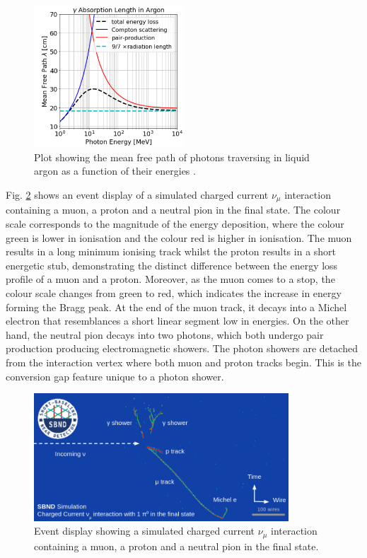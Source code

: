 \begin{figure}[ht!] 
\centering    
\includegraphics[width=0.5\textwidth]{uboone_gamma}
\caption[uboone_gamma]{
Plot showing the mean free path of photons traversing in liquid argon as a function of their energies \cite{uboone_gamma}.
}
\label{fig:uboone_gamma}
\end{figure}

Fig. \ref{fig:track_shower} shows an event display of a simulated charged current $\nu_{\mu}$ interaction containing a muon, a proton and a neutral pion in the final state.
The colour scale corresponds to the magnitude of the energy deposition, where the colour green is lower in ionisation and the colour red is higher in ionisation.
The muon results in a long minimum ionising track whilst the proton results in a short energetic stub, demonstrating the distinct difference between the energy loss profile of a muon and a proton.
Moreover, as the muon comes to a stop, the colour scale changes from green to red, which indicates the increase in energy forming the Bragg peak.
At the end of the muon track, it decays into a Michel electron that resemblances a short linear segment low in energies. 
On the other hand, the neutral pion decays into two photons, which both undergo pair production producing electromagnetic showers.
The photon showers are detached from the interaction vertex where both muon and proton tracks begin.
This is the conversion gap feature unique to a photon shower.

\begin{figure}[ht!] 
\centering    
\includegraphics[width=0.85\textwidth]{event_display}
\caption[track_shower]{
Event display showing a simulated charged current $\nu_{\mu}$ interaction containing a muon, a proton and a neutral pion in the final state.
}
\label{fig:track_shower}
\end{figure}

